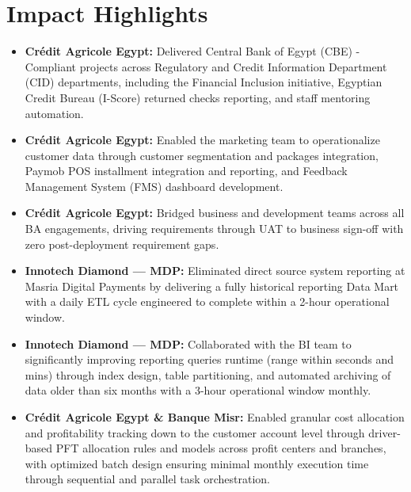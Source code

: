 \section{Impact Highlights}
\begin{itemize}
  \item \textbf{Crédit Agricole Egypt:} Delivered Central Bank of Egypt (CBE) -Compliant projects across Regulatory and Credit Information Department (CID) departments, including the Financial Inclusion initiative, Egyptian Credit Bureau (I-Score)  returned checks reporting, and staff mentoring automation.
  \item \textbf{Crédit Agricole Egypt:} Enabled the marketing team to operationalize customer data through customer segmentation and packages integration, Paymob POS installment integration and reporting, and Feedback Management System (FMS) dashboard development.
  \item \textbf{Crédit Agricole Egypt:} Bridged business and development teams across all BA engagements, driving requirements through UAT to business sign-off with zero post-deployment requirement gaps.
  \item \textbf{Innotech Diamond — MDP:} Eliminated direct source system reporting at Masria Digital Payments by delivering a fully historical reporting Data Mart with a daily ETL cycle engineered to complete within a 2-hour operational window.
  \item \textbf{Innotech Diamond — MDP:} Collaborated with the BI team to significantly improving reporting queries runtime (range within seconds and mins) through index design, table partitioning, and automated archiving of data older than six months with a 3-hour operational window monthly.
  \item \textbf{Crédit Agricole Egypt \& Banque Misr:} Enabled granular cost allocation and profitability tracking down to the customer account level through driver-based PFT allocation rules and models across profit centers and branches, with optimized batch design ensuring minimal monthly execution time through sequential and parallel task orchestration.
\end{itemize}

